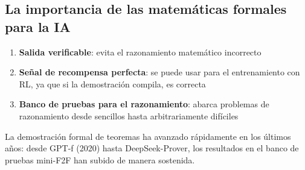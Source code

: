 \subsection{La importancia de las matemáticas formales para la IA}

\begin{enumerate}
    \item \textbf{Salida verificable}: evita el razonamiento matemático incorrecto
    \item \textbf{Señal de recompensa perfecta}: se puede usar para el entrenamiento con RL, ya que si la demostración compila, es correcta
    \item \textbf{Banco de pruebas para el razonamiento}: abarca problemas de razonamiento desde sencillos hasta arbitrariamente difíciles
\end{enumerate}

La demostración formal de teoremas ha avanzado rápidamente en los últimos años: desde GPT-f (2020) hasta DeepSeek-Prover, los resultados en el banco de pruebas mini-F2F han subido de manera sostenida.
